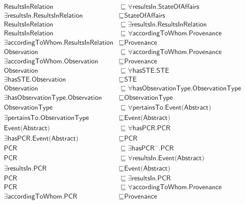 \begin{align}
  \textsf{ResultsInRelation} &\sqsubseteq \forall \textsf{resultsIn.StateOfAffairs} \\
  \exists \textsf{resultsIn.ResultsInRelation} &\sqsubseteq \textsf{StateOfAffairs} \\
  \textsf{ResultsInRelation} &\sqsubseteq \exists \textsf{resultsIn.ResultsInRelation} \\
  \textsf{ResultsInRelation} &\sqsubseteq \forall \textsf{accordingToWhom.Provenance} \\
  \exists \textsf{accordingToWhom.ResultsInRelation} &\sqsubseteq \textsf{Provenance} \\
  \textsf{Observation} &\sqsubseteq \forall \textsf{accordingToWhom.Provenance} \\
  \exists \textsf{accordingToWhom.Observation} &\sqsubseteq \textsf{Provenance} \\
  \textsf{Observation} &\sqsubseteq \forall \textsf{hasSTE.STE} \\
  \exists \textsf{hasSTE.Observation} &\sqsubseteq \textsf{STE} \\
  \textsf{Observation} &\sqsubseteq \forall \textsf{hasObservationType.ObservationType} \\
  \exists \textsf{hasObservationType.Observation} &\sqsubseteq \textsf{ObservationType} \\
  \textsf{ObservationType} &\sqsubseteq \forall \textsf{pertainsTo.Event(Abstract)} \\
  \exists \textsf{pertainsTo.ObservationType} &\sqsubseteq \textsf{Event(Abstract)} \\
  \textsf{Event(Abstract)} &\sqsubseteq \forall \textsf{hasPCR.PCR} \\
  \exists \textsf{hasPCR.Event(Abstract)} &\sqsubseteq \textsf{PCR} \\
  \textsf{PCR} &\sqsubseteq \exists \textsf{hasPCR}^-\textsf{.PCR} \\
  \textsf{PCR} &\sqsubseteq \forall \textsf{resultsIn.Event(Abstract)} \\
  \exists \textsf{resultsIn.PCR} &\sqsubseteq \textsf{Event(Abstract)} \\
  \textsf{PCR} &\sqsubseteq \exists \textsf{resultsIn.PCR} \\
  \textsf{PCR} &\sqsubseteq \forall \textsf{accordingToWhom.Provenance} \\
  \exists \textsf{accordingToWhom.PCR} &\sqsubseteq \textsf{Provenance} \end{align}

